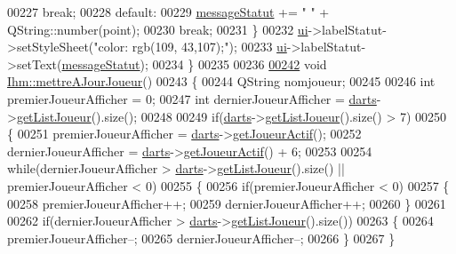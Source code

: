 \begin{DoxyCode}
00227         \textcolor{keywordflow}{break};
00228         \textcolor{keywordflow}{default}:
00229             \hyperlink{class_ihm_a31a25b36e5560142cb156b8b1a25965f}{messageStatut} += \textcolor{stringliteral}{" "} + QString::number(point);
00230         \textcolor{keywordflow}{break};
00231     \}
00232     \hyperlink{class_ihm_a0ac5f47856566ceeeca1720109bf70ea}{ui}->labelStatut->setStyleSheet(\textcolor{stringliteral}{"color: rgb(109, 43,107);"});
00233     \hyperlink{class_ihm_a0ac5f47856566ceeeca1720109bf70ea}{ui}->labelStatut->setText(\hyperlink{class_ihm_a31a25b36e5560142cb156b8b1a25965f}{messageStatut});
00234 \}
00235 
00236 
\hyperlink{class_ihm_aaeeb08a39f940e58da194768763dc00b}{00242} \textcolor{keywordtype}{void} \hyperlink{class_ihm_aaeeb08a39f940e58da194768763dc00b}{Ihm::mettreAJourJoueur}()
00243 \{
00244     QString nomjoueur;
00245 
00246     \textcolor{keywordtype}{int} premierJoueurAfficher = 0;
00247     \textcolor{keywordtype}{int} dernierJoueurAfficher = \hyperlink{class_ihm_a2a0f54d33f4d6b2531ec2190c4a2356e}{darts}->\hyperlink{class_darts_a0525b09703d3461bf5570197354743c3}{getListJoueur}().size();
00248 
00249     \textcolor{keywordflow}{if}(\hyperlink{class_ihm_a2a0f54d33f4d6b2531ec2190c4a2356e}{darts}->\hyperlink{class_darts_a0525b09703d3461bf5570197354743c3}{getListJoueur}().size() > 7)
00250     \{
00251         premierJoueurAfficher = \hyperlink{class_ihm_a2a0f54d33f4d6b2531ec2190c4a2356e}{darts}->\hyperlink{class_darts_a20ddfd28c8355c06a90cc23abff3de11}{getJoueurActif}();
00252         dernierJoueurAfficher = \hyperlink{class_ihm_a2a0f54d33f4d6b2531ec2190c4a2356e}{darts}->\hyperlink{class_darts_a20ddfd28c8355c06a90cc23abff3de11}{getJoueurActif}() + 6;
00253 
00254         \textcolor{keywordflow}{while}(dernierJoueurAfficher > \hyperlink{class_ihm_a2a0f54d33f4d6b2531ec2190c4a2356e}{darts}->\hyperlink{class_darts_a0525b09703d3461bf5570197354743c3}{getListJoueur}().size() || 
      premierJoueurAfficher < 0)
00255         \{
00256             \textcolor{keywordflow}{if}(premierJoueurAfficher < 0)
00257             \{
00258                 premierJoueurAfficher++;
00259                 dernierJoueurAfficher++;
00260             \}
00261 
00262             \textcolor{keywordflow}{if}(dernierJoueurAfficher > \hyperlink{class_ihm_a2a0f54d33f4d6b2531ec2190c4a2356e}{darts}->\hyperlink{class_darts_a0525b09703d3461bf5570197354743c3}{getListJoueur}().size())
00263             \{
00264                 premierJoueurAfficher--;
00265                 dernierJoueurAfficher--;
00266             \}
00267         \}

\end{DoxyCode}
